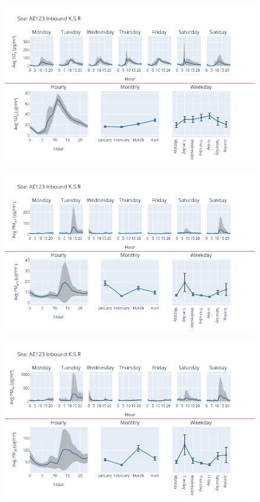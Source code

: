 \documentclass[12pt, oneside]{book}
\begin{document}
{ 
{\begin{figure}[H] 
 \centering 
\includegraphics[width=.88\textwidth, keepaspectratio]{image29} 
 \end{figure}}{} 

{\begin{figure}[H] 
 \centering 
\includegraphics[width=.88\textwidth, keepaspectratio]{image30} 
 \end{figure}}{} 

{\begin{figure}[H] 
 \centering 
\includegraphics[width=.88\textwidth, keepaspectratio]{image31} 
 \end{figure}}{} 

}
\end{document}
